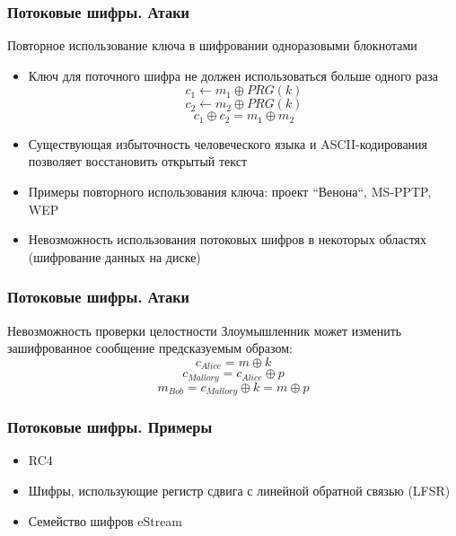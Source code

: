 \documentclass{beamer}
\begin{document}
\begin{frame}
  \frametitle{Потоковые шифры. Атаки}

  \begin{block}{Повторное использование ключа в шифровании одноразовыми блокнотами}
    \begin{itemize}
      \item{Ключ для поточного шифра не должен использоваться больше одного раза
        \[ c_{1} \leftarrow m_{1} \oplus PRG(k) \]
        \[ c_{2} \leftarrow m_{2} \oplus PRG(k) \]
        \[ c_{1} \oplus c_{2} =  m_{1} \oplus m_{2} \]
      }
      \item{Существующая избыточность человеческого языка и ASCII-кодирования позволяет восстановить открытый текст}
      \item{Примеры повторного использования ключа: проект ``Венона``, MS-PPTP, WEP}
      \item{Невозможность использования потоковых шифров в некоторых областях (шифрование данных на диске)}
    \end{itemize}
  \end{block}

\end{frame}


\begin{frame}
  \frametitle{Потоковые шифры. Атаки}

  \begin{block}{Невозможность проверки целостности}
    Злоумышленник может изменить зашифрованное сообщение предсказуемым образом:
      \[ c_{Alice} = m \oplus k \]
      \[ c_{Mallory} = c_{Alice} \oplus p \]
      \[ m_{Bob} = c_{Mallory} \oplus k = m \oplus p \]
  \end{block}

\end{frame}


\begin{frame}
  \frametitle{Потоковые шифры. Примеры}

  \begin{itemize}
    \item{RC4}
    \item{Шифры, использующие регистр сдвига с линейной обратной связью (LFSR)}
    \item{Семейство шифров eStream}
  \end{itemize}

\end{frame}
\end{document}
